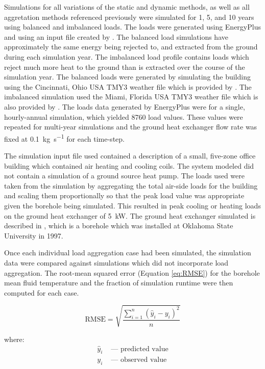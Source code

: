\documentclass[review,12pt]{elsarticle}
\begin{document}
Simulations for all variations of the static and dynamic methods, as well as all aggretation methods referenced previously were simulated for 1, 5, and 10 years using balanced and imbalanced loads. The loads were generated using EnergyPlus \citep{CRAWLEY2001319} and using an input file created by \cite{Deru2011}. The balanced load simulations have approximately the same energy being rejected to, and extracted from the ground during each simulation year. The imbalanced load profile contains loads which reject much more heat to the ground than is extracted over the course of the simulation year. The balanced loads were generated by simulating the building using the Cincinnati, Ohio USA TMY3 weather file which is provided by \cite{DOEWeatherData}. The imbalanced simulation used the Miami, Florida USA TMY3 weather file which is also provided by \cite{DOEWeatherData}. The loads data generated by EnergyPlus were for a single, hourly-annual simulation, which yielded 8760 load values. These values were repeated for multi-year simulations and the ground heat exchanger flow rate was fixed at \SI{0.1}{\kilogram\per\second} for each time-step.

The simulation input file used contained a description of a small, five-zone office building which contained air heating and cooling coils. The system modeled did not contain a simulation of a ground source heat pump. The loads used were taken from the simulation by aggregating the total air-side loads for the building and scaling them proportionally so that the peak load value was appropriate given the borehole being simulated. This resulted in peak cooling or heating loads on the ground heat exchanger of \SI{5}{\kilo\watt}. The ground heat exchanger simulated is described in \cite{BEIER201855}, which is a borehole which was installed at Oklahoma State University in 1997.

Once each individual load aggregation case had been simulated, the simulation data were compared against simulations which did not incorporate load aggregation. The root-mean squared error (Equation \ref{eq:RMSE}) for the borehole mean fluid temperature and the fraction of simulation runtime were then computed for each case.

\begin{equation}
    \mbox{RMSE} = \sqrt{\frac{\sum_{i=1}^n \left(\hat{y}_i - y_i\right)^2}{n}}
    \label{eq:RMSE}
\end{equation}

where:
\begin{align*}
    \hat{y}_i & \mbox{ --- predicted value} \\
    y_i & \mbox{ --- observed value}
\end{align*}
\end{document}
